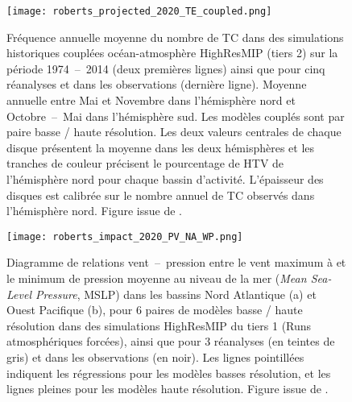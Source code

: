 \documentclass[../main.tex]{subfiles}
\begin{document}
\begin{figure}[tb]
    \centering
    \texttt{[image: roberts\_projected\_2020\_TE\_coupled.png]}
    \caption{Fréquence annuelle moyenne du nombre de TC dans des simulations historiques couplées océan-atmosphère HighResMIP (tiers 2) sur la période
        \num{1974}~--~\num{2014} (deux premières lignes) ainsi que pour cinq réanalyses et dans les observations (dernière ligne). Moyenne annuelle entre Mai et
        Novembre dans l'hémisphère nord et Octobre~--~Mai dans l'hémisphère sud. Les modèles couplés sont par paire basse / haute résolution. Les deux valeurs
        centrales de chaque disque présentent la moyenne dans les deux hémisphères et les tranches de couleur précisent le pourcentage de HTV de l'hémisphère
        nord pour chaque bassin d'activité. L'épaisseur des disques est calibrée sur le nombre annuel de TC observés dans l'hémisphère nord. Figure issue de
        \hbox{\textcite{roberts_projected_2020}}.}
        \label{fig:NTC_HighResMIP}
\end{figure}
\begin{figure}[tb]
    \centering
    \texttt{[image: roberts\_impact\_2020\_PV\_NA\_WP.png]}
    \caption{Diagramme de relations vent~--~pression entre le vent maximum à  et le minimum de pression moyenne au niveau de la mer (\textit{Mean
        Sea-Level Pressure}, MSLP) dans les bassins Nord Atlantique (a) et Ouest Pacifique (b), pour \num{6} paires de modèles basse / haute résolution dans des
        simulations HighResMIP du tiers \num{1} (Runs atmosphériques forcées), ainsi que pour \num{3} réanalyses (en teintes de gris) et dans les observations
        (en noir). Les lignes pointillées indiquent les régressions pour les modèles basses résolution, et les lignes pleines pour les modèles haute résolution.
        Figure issue de \hbox{\textcite{roberts_impact_2020}}.}
    \label{fig:roberts_PV_resolution}
\end{figure}
\end{document}
